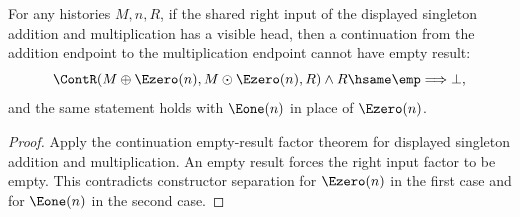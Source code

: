 \begin{theorem}
\label{thm:matrix-singleton-addmul-visible-right-continuation-result-nonempty}
For any histories $M,n,R$, if the shared right input of the displayed
singleton addition and multiplication has a visible head, then a continuation
from the addition endpoint to the multiplication endpoint cannot have empty
result:
$$
\ContR(M\oplus \Ezero(n),M\odot \Ezero(n),R)\land R\hsame\emp
\Longrightarrow\bot,
$$
and the same statement holds with $\Eone(n)$ in place of $\Ezero(n)$.
\end{theorem}
\begin{proof}
Apply the continuation empty-result factor theorem for displayed singleton
addition and multiplication. An empty result forces the right input factor to
be empty. This contradicts constructor separation for $\Ezero(n)$ in the first
case and for $\Eone(n)$ in the second case.
\end{proof}
